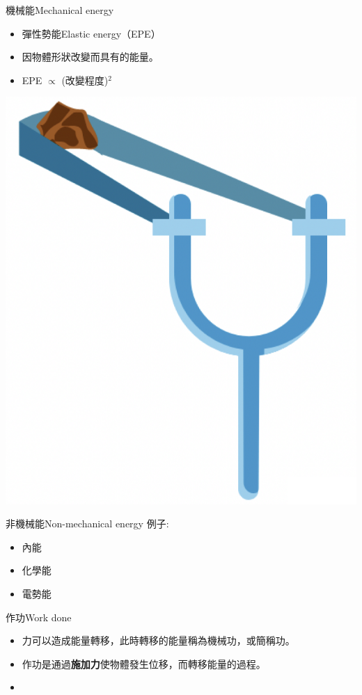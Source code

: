 \documentclass[beamer=true]{standalone}
\begin{document}
\begin{frame}{機械能Mechanical energy}
    \begin{itemize}
        \item 彈性勢能Elastic energy（EPE）
        \item 因物體形狀改變而具有的能量。
        \item EPE $\propto$ (改變程度)$^2$
    \end{itemize}\bigskip
    {\par\centering
        \includegraphics[width=.3\textwidth]{assets/aa983381.png}
        \par}
\end{frame}

\begin{frame}{非機械能Non-mechanical energy}
    例子:
    \begin{itemize}
        \setlength{\itemsep}{12pt}
        \item 內能
        \item 化學能
        \item 電勢能
    \end{itemize}
\end{frame}


\begin{frame}{作功Work done}
    \begin{itemize}
        \item 力可以造成能量轉移，此時轉移的能量稱為機械功，或簡稱功。
        \item 作功是通過\textbf{施加力}使物體發生位移，而轉移能量的過程。
        \item {}
    \end{itemize}
\end{frame}
\end{document}
